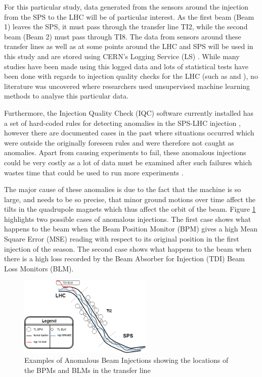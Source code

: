 \documentclass[conference, a4paper]{IEEEtran}
\begin{document}
	\par For this particular study, data generated from the sensors around the injection from the SPS to the LHC will be of particular interest. As the first beam (Beam 1) leaves the SPS, it must pass through the transfer line TI2, while the second beam (Beam 2) must pass through TI8. The data from sensors around these transfer lines as well as at some points around the LHC and SPS will be used in this study and are stored using CERN's Logging Service (LS) \cite{Roderick2013}. While many studies have been made using this logged data and lots of statistical tests have been done with regards to injection quality checks for the LHC (such as \cite{Drosdal2011} and \cite{Kain2010}), no literature was uncovered where researchers used unsupervised machine learning methods to analyse this particular data.
	
	\par Furthermore, the Injection Quality Check (IQC) software currently installed has a set of hard-coded rules for detecting anomalies in the SPS-LHC injection \cite{Drosdal2011}, however there are documented cases in the past where situations occurred which were outside the originally foreseen rules and were therefore not caught as anomalies. Apart from causing experiments to fail, these anomalous injections could be very costly as a lot of data must be examined after such failures which wastes time that could be used to run more experiments \cite{Halilovic2018}. 
	
	\par The major cause of these anomalies is due to the fact that the machine is so large, and needs to be so precise, that minor ground motions over time affect the tilts in the quadrupole magnets which thus affect the orbit of the beam. Figure \ref{fig::AnomalousInjections} highlights two possible cases of anomalous injections. The first case shows what happens to the beam when the Beam Position Monitor (BPM) gives a high Mean Square Error (MSE) reading with respect to its original position in the first injection of the season. The second case shows what happens to the beam when there is a high loss recorded by the Beam Absorber for Injection (TDI) Beam Loss Monitors (BLM).
	
	\begin{figure}[!t]
		\centering
		\includegraphics[width=2.5in]{AnomalousInjections}
		\caption[Anomalous Injections]{Examples of Anomalous Beam Injections showing the locations of the BPMs and BLMs in the transfer line}
		\label{fig::AnomalousInjections}
	\end{figure}
\end{document}
